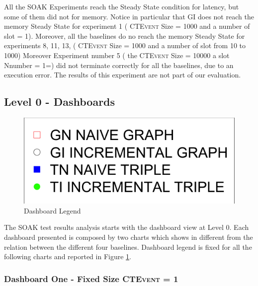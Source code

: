 


All the SOAK Experiments reach the Steady State condition for latency, but some of them did not for memory. Notice in particular that GI does not reach the memory Steady State for experiment 1 (  \textsc{CTEvent}  Size = 1000 and a number of slot = 1). Moreover, all the baselines do no reach the memory  Steady State for experiments 8, 11, 13, ( \textsc{CTEvent}  Size = 1000 and a number of slot from 10 to 1000)  Moreover Experiment number 5 ( the \textsc{CTEvent} Size = 10000 a slot Nnumber = 1=) did not terminate correctly for all the baselines, due to an execution error. The results of this experiment are not part of our evaluation.

\subsection{Level 0 - Dashboards}\label{sec:eval-level0}

\begin{figure}[htb]
	\centering
	\includegraphics[width=0.25\linewidth]{images/dashboard-legend}	
	\caption{Dashboard Legend} 
	\label{fig:dashboard-legend}
\end{figure}

The SOAK test results analysis starts with the dashboard view at Level 0. Each dashboard presented is composed by two charts which shows in different from the relation between the different four baselines. Dashboard legend is fixed for all the following charts and reported in Figure \ref{fig:dashboard-legend}.

\subsubsection{Dashboard One - Fixed Size \textsc{CTEvent} = 1} 

